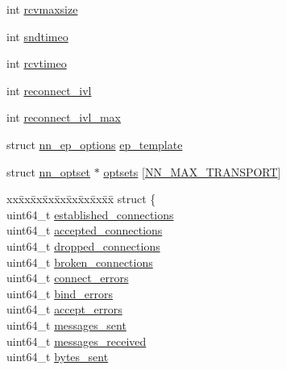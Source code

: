 \begin{DoxyCompactItemize}
\item 
int \hyperlink{structnn__sock_ab9c1d5c09c74c1f1228f643bc87f0187}{rcvmaxsize}
\item 
int \hyperlink{structnn__sock_afe1318c3db26b711a788e5fc8fce8838}{sndtimeo}
\item 
int \hyperlink{structnn__sock_ad118169c7decab1c9ecb75c07a6d104b}{rcvtimeo}
\item 
int \hyperlink{structnn__sock_af39c561b3b34a6cd5950f80af1bb3248}{reconnect\+\_\+ivl}
\item 
int \hyperlink{structnn__sock_aab0fa9a0fe42e0791d83ae4d0bed6b8b}{reconnect\+\_\+ivl\+\_\+max}
\item 
struct \hyperlink{structnn__ep__options}{nn\+\_\+ep\+\_\+options} \hyperlink{structnn__sock_a497b47e1188091bd4394ffc701ebc79e}{ep\+\_\+template}
\item 
struct \hyperlink{structnn__optset}{nn\+\_\+optset} $\ast$ \hyperlink{structnn__sock_af9331237e898452f3525324d5f9a376c}{optsets} \mbox{[}\hyperlink{sock_8h_ab9b315ab0f1ce415349674677e90f527}{N\+N\+\_\+\+M\+A\+X\+\_\+\+T\+R\+A\+N\+S\+P\+O\+RT}\mbox{]}
\item 
\begin{tabbing}
xx\=xx\=xx\=xx\=xx\=xx\=xx\=xx\=xx\=\kill
struct \{\\
\>uint64\_t \hyperlink{structnn__sock_afd96e7bdc461ec48cc0a86282e5a8472}{established\_connections}\\
\>uint64\_t \hyperlink{structnn__sock_a4aeac0a4a30b852422bba1fac60f68a0}{accepted\_connections}\\
\>uint64\_t \hyperlink{structnn__sock_ac1165e1e66d693d44b95515288fede03}{dropped\_connections}\\
\>uint64\_t \hyperlink{structnn__sock_a10d39dc513902848eaf350d887fce1a4}{broken\_connections}\\
\>uint64\_t \hyperlink{structnn__sock_a3169a56955839c24d591d72caab921f4}{connect\_errors}\\
\>uint64\_t \hyperlink{structnn__sock_aa5003b128cda54acb1002ec3339d29ca}{bind\_errors}\\
\>uint64\_t \hyperlink{structnn__sock_a404c2b224c226875a95b15fe245f9d98}{accept\_errors}\\
\>uint64\_t \hyperlink{structnn__sock_a417a8cd7dc4c2814d26f8503ee0bac96}{messages\_sent}\\
\>uint64\_t \hyperlink{structnn__sock_ad77d1912739cfcc7999365a51d825198}{messages\_received}\\
\>uint64\_t \hyperlink{structnn__sock_aa9597d3fdc890e9ea04dc617363134c3}{bytes\_sent}\\

\end{tabbing}
\end{DoxyCompactItemize}
